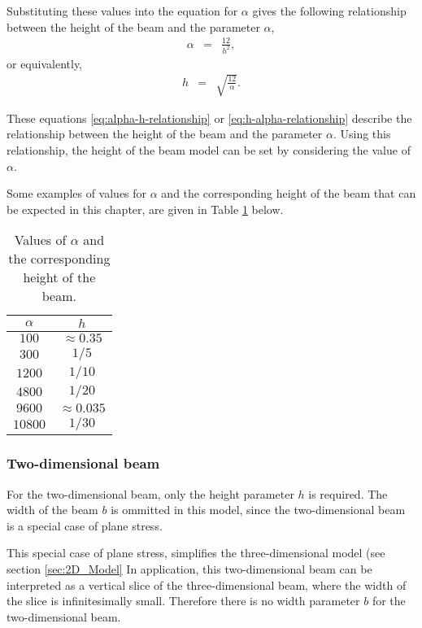 \documentclass[../../main.tex]{subfiles}
\begin{document}
Substituting these values into the equation for $\alpha$ gives the following relationship between the height of the beam and the parameter $\alpha$,
\begin{eqnarray}
	\alpha & = & \frac{12}{h^2}, \label{eq:alpha-h-relationship}
\end{eqnarray}
or equivalently,
\begin{eqnarray}
	h & = & \sqrt{\frac{12}{\alpha}}. \label{eq:h-alpha-relationship}
\end{eqnarray}

These equations \eqref{eq:alpha-h-relationship} or \eqref{eq:h-alpha-relationship} describe the relationship between the height of the beam and the parameter $\alpha$. Using this relationship, the height of the beam model can be set by considering the value of $\alpha$.

Some examples of values for $\alpha$ and the corresponding height of the beam that can be expected in this chapter, are given in Table \ref{tab:alphaheight} below.

\begin{table}[h]
	\centering
	\begin{tabular}{|c|c|}
		\hline
		$\alpha$ & $h$\\
		\hline
		$100$ & $\approx 0.35$ \\
		$300$ & $1/5$ \\
		$1200$ & $1/10$ \\
		$4800$ & $1/20$ \\
		$9600$ & $\approx 0.035$ \\
		$10800$ & $1/30$ \\
		\hline
	\end{tabular}
	\caption{Values of $\alpha$ and the corresponding height of the beam.}
	\label{tab:alphaheight}
\end{table}

\subsubsection{Two-dimensional beam}

For the two-dimensional beam, only the height parameter $h$ is required. The width of the beam $b$ is ommitted in this model, since the two-dimensional beam is a special case of plane stress.

This special case of plane stress, simplifies the three-dimensional model (see section \ref{sec:2D_Model} In application, this two-dimensional beam can be interpreted as a vertical slice of the three-dimensional beam, where the width of the slice is infinitesimally small. Therefore there is no width parameter $b$ for the two-dimensional beam.
\end{document}
